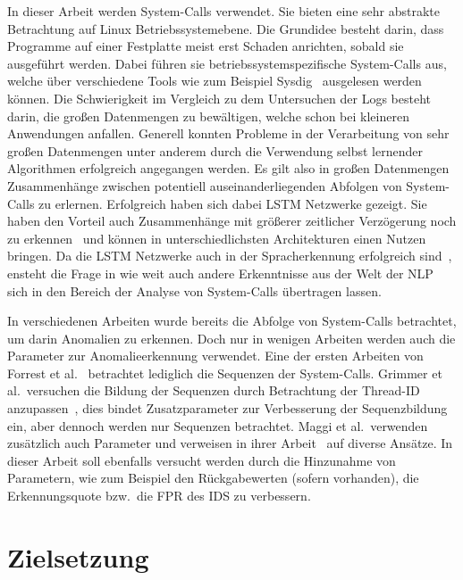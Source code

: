 In dieser Arbeit werden System-Calls verwendet.
Sie bieten eine sehr abstrakte Betrachtung auf Linux Betriebssystemebene.
Die Grundidee besteht darin, dass Programme auf einer Festplatte meist erst Schaden anrichten, sobald sie ausgeführt werden.
Dabei führen sie betriebssystemspezifische System-Calls aus, welche über verschiedene Tools wie zum Beispiel Sysdig~\cite{SYSDIG} ausgelesen werden können.
Die Schwierigkeit im Vergleich zu dem Untersuchen der Logs besteht darin, die großen Datenmengen zu bewältigen, welche schon bei kleineren Anwendungen anfallen.
Generell konnten Probleme in der Verarbeitung von sehr großen Datenmengen unter anderem durch die Verwendung selbst lernender Algorithmen erfolgreich angegangen werden.
Es gilt also in großen Datenmengen Zusammenhänge zwischen potentiell auseinanderliegenden Abfolgen von System-Calls zu erlernen.
Erfolgreich haben sich dabei \ac{LSTM} Netzwerke gezeigt.
Sie haben den Vorteil auch Zusammenhänge mit größerer zeitlicher Verzögerung noch zu erkennen~\cite{HOCHREITER} und können in unterschiedlichsten Architekturen einen Nutzen bringen. %
Da die \ac{LSTM} Netzwerke auch in der Spracherkennung erfolgreich sind~\cite{NLP_LSTM}, ensteht die Frage in wie weit auch andere Erkenntnisse aus der Welt der \ac{NLP} sich in den Bereich der Analyse von System-Calls übertragen lassen.



In verschiedenen Arbeiten wurde bereits die Abfolge von System-Calls betrachtet, um darin Anomalien zu erkennen. 
Doch nur in wenigen Arbeiten werden auch die Parameter zur Anomalieerkennung verwendet.
Eine der ersten Arbeiten von Forrest et al.~\cite{FORREST} betrachtet lediglich die Sequenzen der System-Calls.
Grimmer et al.\ versuchen die Bildung der Sequenzen durch Betrachtung der Thread-ID anzupassen~\cite{LIDS}, dies bindet Zusatzparameter zur Verbesserung der Sequenzbildung ein, aber dennoch werden \glqq nur \grqq{} Sequenzen betrachtet.
Maggi et al.\ verwenden zusätzlich auch Parameter und verweisen in ihrer Arbeit~\cite{MAGGI} auf diverse Ansätze.
In dieser Arbeit soll ebenfalls versucht werden durch die Hinzunahme von Parametern, wie zum Beispiel den Rückgabewerten (sofern vorhanden), die Erkennungsquote bzw.\ die \ac{FPR} des \ac{IDS} zu verbessern.


\section{Zielsetzung}

